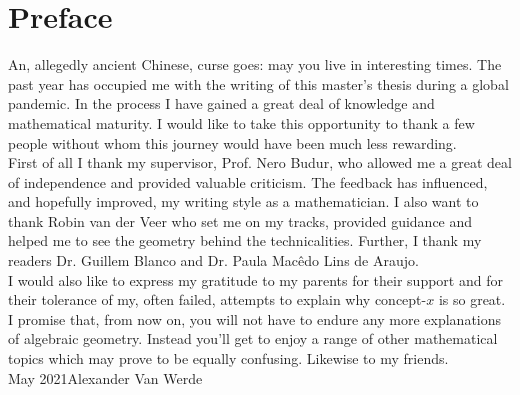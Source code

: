 \chapter*{Preface}
An, allegedly ancient Chinese, curse goes: may you live in interesting times.
The past year has occupied me with the writing of this master's thesis during a global pandemic.
In the process I have gained a great deal of knowledge and mathematical maturity.
I would like to take this opportunity to thank a few people without whom this journey would have been much less rewarding.\\

\noindent
First of all I thank my supervisor, Prof. Nero Budur, who allowed me a great deal of independence and provided valuable criticism.
The feedback has influenced, and hopefully improved, my writing style as a mathematician.
I also want to thank Robin van der Veer who set me on my tracks, provided guidance and helped me to see the geometry behind the technicalities. 
Further, I thank my readers Dr. Guillem Blanco and Dr. Paula Mac\^edo Lins de Araujo.
\\

\noindent
I would also like to express my gratitude to my parents for their support and for their tolerance of my, often failed, attempts to explain why concept-$x$ is so great.
I promise that, from now on, you will not have to endure any more explanations of algebraic geometry.
Instead you'll get to enjoy a range of other mathematical topics which may prove to be equally confusing. Likewise to my friends.\\[2em]

\noindent
May 2021\hfill Alexander Van Werde